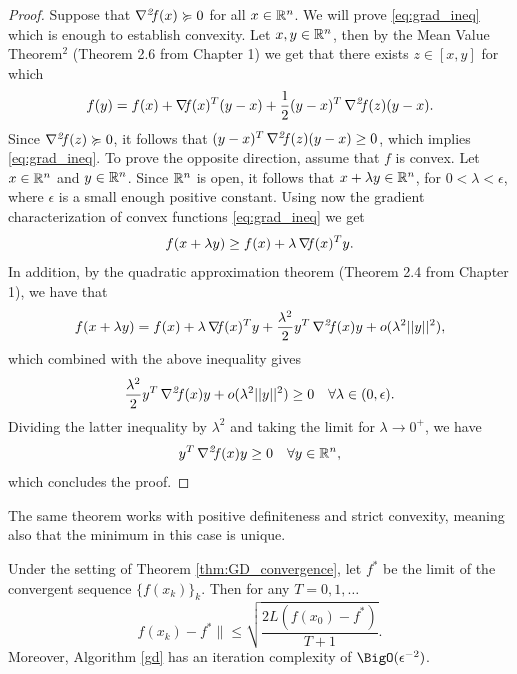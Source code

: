 \documentclass[10pt,a4paper]{article}
\begin{document}
\begin{proof}
	Suppose that $\operatorname*{\mathit{\nabla^2 \!f}}(x) \succcurlyeq 0$ for all $x \in \mathbb{R}^n$. We will prove \eqref{eq:grad_ineq} which is enough to establish convexity. Let $x,y\in \mathbb{R}^n$, then by the Mean Value Theorem$^2$ (Theorem 2.6 from Chapter 1) we get that there exists $z\in[x,y]$ for which 
	\begin{equation}\label{eq:mvt2_app}
		f(y) = f(x)+ \operatorname*{\mathit{\nabla \!f}} (x)^T(y-x) +\frac{1}{2}(y-x)^T\operatorname*{\mathit{\nabla^2 \!f}}(z)(y-x).
	\end{equation}
	Since $\operatorname*{\mathit{\nabla^2 \!f}}(z) \succcurlyeq 0$, it follows that $(y-x)^T\operatorname*{\mathit{\nabla^2 \!f}}(z)(y-x)\geq0$, which implies \eqref{eq:grad_ineq}.
	To prove the opposite direction, assume that $f$ is convex. Let $x\in \mathbb{R}^n$ and $y\in \mathbb{R}^n$. Since $\mathbb{R}^n$ is open, it follows that $x+\lambda y \in \mathbb{R}^n$, for $0<\lambda<\epsilon$, where $\epsilon$ is a small enough positive constant. Using now the gradient characterization of convex functions \eqref{eq:grad_ineq} we get 
	\begin{equation*}
		f(x+\lambda y) \geq f(x) + \lambda\operatorname*{\mathit{\nabla \!f}}(x)^Ty.
	\end{equation*}
	In addition, by the quadratic approximation theorem (Theorem 2.4 from Chapter 1), we have that 
	\begin{equation*}
		f(x+\lambda y) = f(x) + \lambda \operatorname*{\mathit{\nabla \!f}}(x)^Ty + \frac{\lambda^2}{2}y^T\operatorname*{\mathit{\nabla^2 \!f}}(x)y + o(\lambda^2||y||^2),
	\end{equation*}
	which combined with the above inequality gives 
	\begin{equation*}
		\frac{\lambda^2}{2}y^T\operatorname*{\mathit{\nabla^2 \!f}}(x)y + o(\lambda^2||y||^2) \geq 0 \quad \forall \lambda\in (0,\epsilon).
	\end{equation*}
	Dividing the latter inequality by $\lambda^2$ and taking the limit for $\lambda\to 0^+$, we have 
	\begin{equation*}
		y^T\operatorname*{\mathit{\nabla^2 \!f}}(x)y \geq 0 \quad \forall y \in \mathbb{R}^n,
	\end{equation*}
	which concludes the proof.
\end{proof}
The same theorem works with positive definiteness and strict convexity, meaning also that the minimum in this case is unique.

\begin{theorem}
	Under the setting of Theorem \ref{thm:GD_convergence}, let $f^*$ be the limit of the convergent sequence $\{f(x_k)\}_k$. Then for any $T=0,1, \dots$
	\begin{equation}\label{eq:convex_convergence}
		f(x_k) -f^* \|\leq \sqrt{\frac{2L (f(x_0) -f^*)}{T+1}}.
	\end{equation}
	Moreover, Algorithm \ref{gd} has an iteration complexity of $\BigO(\epsilon^{-2})$.
\end{theorem}
\end{document}
